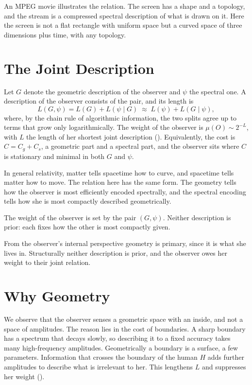 \documentclass[11pt]{book}
\begin{document}
An MPEG movie illustrates the relation. The screen has a shape and a
topology, and the stream is a compressed spectral description of what is
drawn on it. Here the screen is not a flat rectangle with uniform space but
a curved space of three dimensions plus time, with any topology.


\section{The Joint Description}
\label{sec:joint}

Let $G$ denote the geometric description of the observer and $\psi$ the
spectral one. A description of the observer consists of the pair, and its
length is
\[
  L(G,\psi) = L(G) + L(\psi \mid G) \;\approx\; L(\psi) + L(G \mid \psi),
\]
where, by the chain rule of algorithmic information, the two splits agree
up to terms that grow only logarithmically. The weight of the observer is
$\mu(O) \sim 2^{-L}$, with $L$ the length of her shortest joint
description (). Equivalently, the cost is
$C = C_g + C_s$, a geometric part and a spectral part, and the observer
sits where $C$ is stationary and minimal in both $G$ and $\psi$.

In general relativity, matter tells spacetime how to curve, and spacetime
tells matter how to move. The relation here has the same form. The geometry
tells how the observer is most efficiently encoded spectrally, and the
spectral encoding tells how she is most compactly described geometrically.

\begin{deduction}\label{ded:joint}
  The weight of the observer is set by the pair $(G,\psi)$. Neither
  description is prior: each fixes how the other is most compactly given.
\end{deduction}

From the observer's internal perspective geometry is primary, since it is
what she lives in. Structurally neither description is prior, and the
observer owes her weight to their joint relation.


\section{Why Geometry}
\label{sec:geometry}

We observe that the observer senses a geometric space with an inside, and
not a space of amplitudes. The reason lies in the cost of boundaries. A
sharp boundary has a spectrum that decays slowly, so describing it to a
fixed accuracy takes many high-frequency amplitudes. Geometrically a
boundary is a surface, a few parameters. Information that crosses the
boundary of the human $H$ adds further amplitudes to describe what is
irrelevant to her. This lengthens $L$ and suppresses her weight
().
\end{document}
